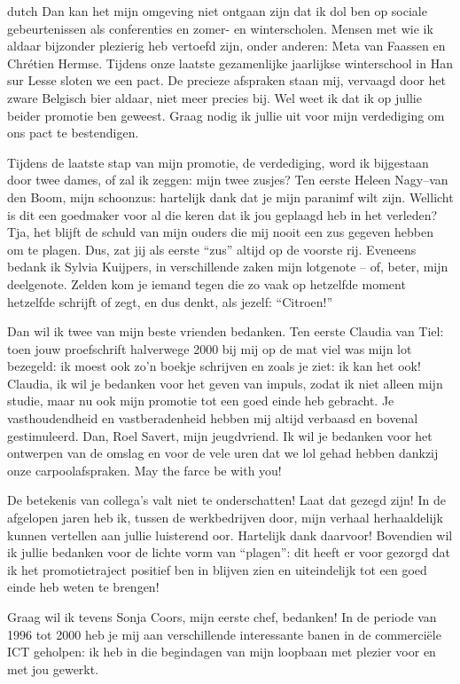 \begin{otherlanguage*}{dutch}
Dan kan het mijn omgeving niet ontgaan zijn dat ik dol ben op sociale gebeurtenissen als conferenties en zomer- en winterscholen. Mensen met wie ik aldaar bijzonder plezierig heb vertoefd zijn, onder anderen: Meta van Faassen en Chr\'{e}tien Hermse. Tijdens onze laatste gezamenlijke jaarlijkse winterschool in Han sur Lesse sloten we een pact. De precieze afspraken staan mij, vervaagd door het zware Belgisch bier aldaar, niet meer precies bij. Wel weet ik dat ik op jullie beider promotie ben geweest. Graag nodig ik jullie uit voor mijn verdediging om ons pact te bestendigen.

Tijdens de laatste stap van mijn promotie, de verdediging, word ik bijgestaan door twee dames, of zal ik zeggen: mijn twee zusjes? Ten eerste Heleen Nagy--van den Boom, mijn schoonzus: hartelijk dank dat je mijn paranimf wilt zijn. Wellicht is dit een goedmaker voor al die keren dat ik jou geplaagd heb in het verleden? Tja, het blijft de schuld van mijn ouders die mij nooit een zus gegeven hebben om te plagen. Dus, zat jij als eerste ``zus'' altijd op de voorste rij. Eveneens bedank ik Sylvia Kuijpers, in verschillende zaken mijn lotgenote -- of, beter, mijn deelgenote. Zelden kom je iemand tegen die zo vaak op hetzelfde moment hetzelfde schrijft of zegt, en dus denkt, als jezelf: ``Citroen!''

Dan wil ik twee van mijn beste vrienden bedanken. Ten eerste Claudia van Tiel: toen jouw proefschrift halverwege 2000 bij mij op de mat viel was mijn lot bezegeld: ik moest ook zo'n boekje schrijven en zoals je ziet: ik kan het ook! Claudia, ik wil je bedanken voor het geven van impuls, zodat ik niet alleen mijn studie, maar nu ook mijn promotie tot een goed einde heb gebracht. Je vasthoudendheid en vastberadenheid hebben mij altijd verbaasd en bovenal gestimuleerd. Dan, Roel Savert, mijn jeugdvriend. Ik wil je bedanken voor het ontwerpen van de omslag en voor de vele uren dat we lol gehad hebben dankzij onze carpoolafspraken. May the farce be with you!

De betekenis van collega's valt niet te onderschatten! Laat dat gezegd zijn! In de afgelopen jaren heb ik, tussen de werkbedrijven door, mijn verhaal herhaaldelijk kunnen vertellen aan jullie luisterend oor. Hartelijk dank daarvoor! Bovendien wil ik jullie bedanken voor de lichte vorm van ``plagen'': dit heeft er voor gezorgd dat ik het promotietraject positief ben in blijven zien en uiteindelijk tot een goed einde heb weten te brengen!

Graag wil ik tevens Sonja Coors, mijn eerste chef, bedanken! In de periode van 1996 tot 2000 heb je mij aan verschillende interessante banen in de commerci\"{e}le ICT geholpen: ik heb in die begindagen van mijn loopbaan met plezier voor en met jou gewerkt.


\end{otherlanguage*}
